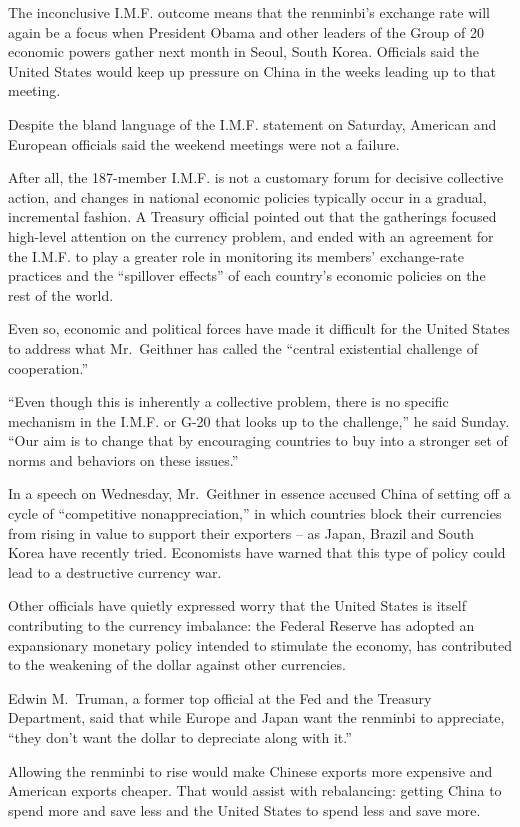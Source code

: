 ﻿\documentclass[12pt]{article}
\begin{document}
The inconclusive I.M.F. outcome means that the renminbi's exchange rate will again be a focus when
President Obama and other leaders of the Group of 20 economic powers gather next month in Seoul,
South Korea. Officials said the United States would keep up pressure on China in the weeks leading
up to that meeting.

Despite the bland language of the I.M.F. statement on Saturday, American and European officials said
the weekend meetings were not a failure.

After all, the 187-member I.M.F. is not a customary forum for decisive collective action, and
changes in national economic policies typically occur in a gradual, incremental fashion. A Treasury
official pointed out that the gatherings focused high-level attention on the currency problem, and
ended with an agreement for the I.M.F. to play a greater role in monitoring its members'
exchange-rate practices and the ``spillover effects” of each country's economic policies on the
rest of the world.

Even so, economic and political forces have made it difficult for the United States to address what
Mr.~Geithner has called the ``central existential challenge of cooperation.''

``Even though this is inherently a collective problem, there is no specific mechanism in the I.M.F.
or G-20 that looks up to the challenge,'' he said Sunday. ``Our aim is to change that by encouraging
countries to buy into a stronger set of norms and behaviors on these issues.''

In a speech on Wednesday, Mr.~Geithner in essence accused China of setting off a cycle of
``competitive nonappreciation,'' in which countries block their currencies from rising in value to
support their exporters -- as Japan, Brazil and South Korea have recently tried. Economists have
warned that this type of policy could lead to a destructive currency war.

Other officials have quietly expressed worry that the United States is itself contributing to the
currency imbalance: the Federal Reserve has adopted an expansionary monetary policy intended to
stimulate the economy, has contributed to the weakening of the dollar against other currencies.

Edwin M.~Truman, a former top official at the Fed and the Treasury Department, said that while
Europe and Japan want the renminbi to appreciate, ``they don't want the dollar to depreciate along
with it.''

Allowing the renminbi to rise would make Chinese exports more expensive and American exports
cheaper. That would assist with rebalancing: getting China to spend more and save less and the
United States to spend less and save more.
\end{document}
